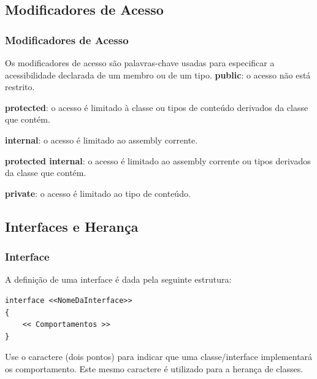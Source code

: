 \documentclass{beamer}
\begin{document}
\subsection{Modificadores de Acesso}
\begin{frame}
\frametitle{Modificadores de Acesso}
\begin{outline}
	\1 Os modificadores de acesso são palavras-chave usadas para especificar a acessibilidade declarada de um membro ou de um tipo. 
	\2 \textbf{public}: o acesso não está restrito.
	
	\2 \textbf{protected}: o acesso é limitado à classe ou tipos de conteúdo derivados da classe que contém.
	
	\2 \textbf{internal}: o acesso é limitado ao assembly corrente.
	
	\2 \textbf{protected internal}: o acesso é limitado ao assembly corrente ou tipos derivados da classe que contém.
	
	\2 \textbf{private}: o acesso é limitado ao tipo de conteúdo.
	
\end{outline}
\end{frame}






\subsection{Interfaces e Herança}

\begin{frame}[fragile]
\frametitle{Interface}
\begin{outline}
	\1 A definição de uma interface é dada pela seguinte estrutura:
	
\2 \begin{lstlisting}
interface <<NomeDaInterface>>
{
	<< Comportamentos >>
}
\end{lstlisting}
\1 Use o caractere \codef{:} (dois pontos) para indicar que uma classe/interface implementará os comportamento. Este mesmo caractere é utilizado para a herança de classes.
\end{outline}
\end{frame}
\end{document}

